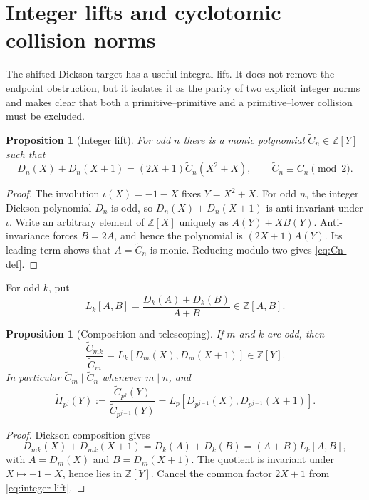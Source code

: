 \documentclass[a4paper]{article}
\newtheorem{proposition}[theorem]{Proposition}
\newcommand{\Z}{\mathbb{Z}}
\begin{document}
\section{Integer lifts and cyclotomic collision norms}
\label{sec:collision-norms}

The shifted-Dickson target has a useful integral lift.  It does not remove
the endpoint obstruction, but it isolates it as the parity of two explicit
integer norms and makes clear that both a primitive--primitive and a
primitive--lower collision must be excluded.

\begin{proposition}[Integer lift]\label{prop:integer-lift}
	For odd $n$ there is a monic polynomial
	$\widetilde C_n\in\Z[Y]$ such that
	\begin{equation}\label{eq:integer-lift}
		D_n(X)+D_n(X+1)
		=(2X+1)\widetilde C_n(X^2+X),
		\qquad
		\widetilde C_n\equiv C_n\pmod2.
	\end{equation}
\end{proposition}

\begin{proof}
	The involution $\iota(X)=-1-X$ fixes $Y=X^2+X$.  For odd $n$, the
	integer Dickson polynomial $D_n$ is odd, so
	$D_n(X)+D_n(X+1)$ is anti-invariant under $\iota$.
	Write an arbitrary element of $\Z[X]$ uniquely as $A(Y)+XB(Y)$.
	Anti-invariance forces $B=2A$, and hence the polynomial is
	$(2X+1)A(Y)$.  Its leading term shows that $A=\widetilde C_n$ is
	monic.  Reducing modulo two gives \eqref{eq:Cn-def}.
\end{proof}

For odd $k$, put
\[
	L_k[A,B]=\frac{D_k(A)+D_k(B)}{A+B}\in\Z[A,B].
\]

\begin{proposition}[Composition and telescoping]\label{prop:integer-telescope}
	If $m$ and $k$ are odd, then
	\[
		\frac{\widetilde C_{mk}}{\widetilde C_m}
		=L_k[D_m(X),D_m(X+1)]\in\Z[Y].
	\]
	In particular $\widetilde C_m\mid\widetilde C_n$ whenever $m\mid n$,
	and
	\begin{equation}\label{eq:integer-telescope}
		\widetilde\Pi_{p^j}(Y)
		:=\frac{\widetilde C_{p^j}(Y)}
		        {\widetilde C_{p^{j-1}}(Y)}
		=L_p[D_{p^{j-1}}(X),D_{p^{j-1}}(X+1)].
	\end{equation}
\end{proposition}

\begin{proof}
	Dickson composition gives
	\[
		D_{mk}(X)+D_{mk}(X+1)
		=D_k(A)+D_k(B)=(A+B)L_k[A,B],
	\]
	with $A=D_m(X)$ and $B=D_m(X+1)$.  The quotient is invariant under
	$X\mapsto-1-X$, hence lies in $\Z[Y]$.  Cancel the common factor
	$2X+1$ from \eqref{eq:integer-lift}.
\end{proof}
\end{document}

